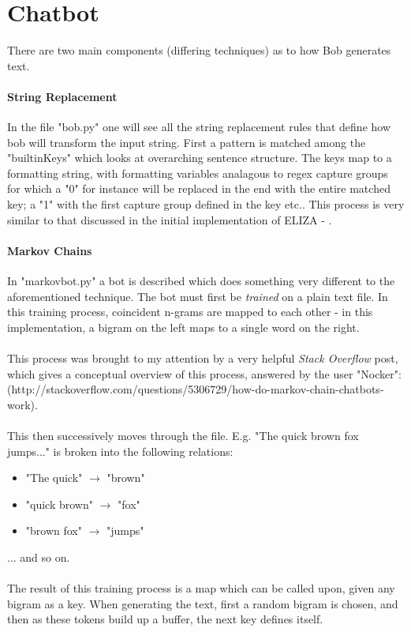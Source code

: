 \documentclass[]{article}
\begin{document}
\section{Chatbot}
There are two main components (differing techniques) as to how Bob generates text.
\paragraph{String Replacement} In the file "bob.py" one will see all the string replacement rules that define how bob will transform the input string. First a pattern is matched among the "builtinKeys" which looks at overarching sentence structure. The keys map to a formatting string, with formatting variables analagous to regex capture groups for which a "{0}" for instance will be replaced in the end with the entire matched key; a "{1}" with the first capture group defined in the key etc.. This process is very similar to that discussed in the initial implementation of ELIZA - \cite{Weizenbaum}.

\paragraph{Markov Chains} In "markovbot.py" a bot is described which does something very different to the aforementioned technique. The bot must first be \emph{trained} on a plain text file. In this training process, coincident n-grams are mapped to each other - in this implementation, a bigram on the left maps to a single word on the right.
\\\\
This process was brought to my attention by a very helpful \emph{Stack Overflow} post, which gives a conceptual overview of this process, answered by the user "Nocker": (http://stackoverflow.com/questions/5306729/how-do-markov-chain-chatbots-work).
\\\\
This then successively moves through the file. E.g. "The quick brown fox jumps..." is broken into the following relations:
\begin{itemize}
	\item "The quick" $\rightarrow$ "brown"
	\item "quick brown" $\rightarrow$ "fox"
	\item "brown fox" $\rightarrow$ "jumps"
\end{itemize}
... and so on.
\\\\
The result of this training process is a map which can be called upon, given any bigram as a key. When generating the text, first a random bigram is chosen, and then as these tokens build up a buffer, the next key defines itself.
\end{document}
